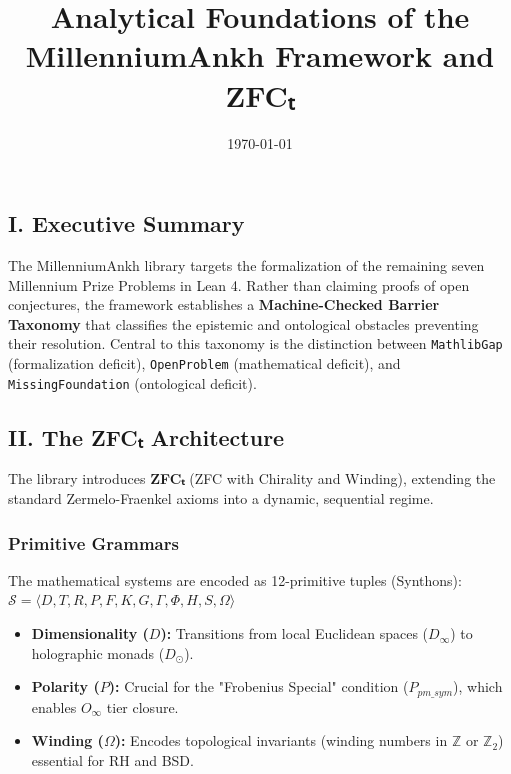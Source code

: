 \documentclass[12pt,a4paper]{article}
\begin{document}
\title{Analytical Foundations of the MillenniumAnkh Framework and ZFCₜ}
\date{\today}

\maketitle

\subsection{I. Executive Summary}

The MillenniumAnkh library targets the formalization of the remaining seven Millennium Prize Problems in Lean 4. Rather than claiming proofs of open conjectures, the framework establishes a \textbf{Machine-Checked Barrier Taxonomy} that classifies the epistemic and ontological obstacles preventing their resolution. Central to this taxonomy is the distinction between \texttt{MathlibGap} (formalization deficit), \texttt{OpenProblem} (mathematical deficit), and \texttt{MissingFoundation} (ontological deficit).

\subsection{II. The ZFCₜ Architecture}

The library introduces \textbf{ZFCₜ} (ZFC with Chirality and Winding), extending the standard Zermelo-Fraenkel axioms into a dynamic, sequential regime.

\subsubsection{Primitive Grammars}

The mathematical systems are encoded as 12-primitive tuples (Synthons):
$\mathcal{S} = \langle D, T, R, P, F, K, G, \Gamma, \Phi, H, S, \Omega \rangle$

\begin{itemize}
    \item \textbf{Dimensionality ($D$):} Transitions from local Euclidean spaces ($D_{\infty}$) to holographic monads ($D_{\odot}$).
    \item \textbf{Polarity ($P$):} Crucial for the "Frobenius Special" condition ($P_{pm\_sym}$), which enables $O_{\infty}$ tier closure.
    \item \textbf{Winding ($\Omega$):} Encodes topological invariants (winding numbers in $\mathbb{Z}$ or $\mathbb{Z}_2$) essential for RH and BSD.
\end{itemize}
\end{document}

